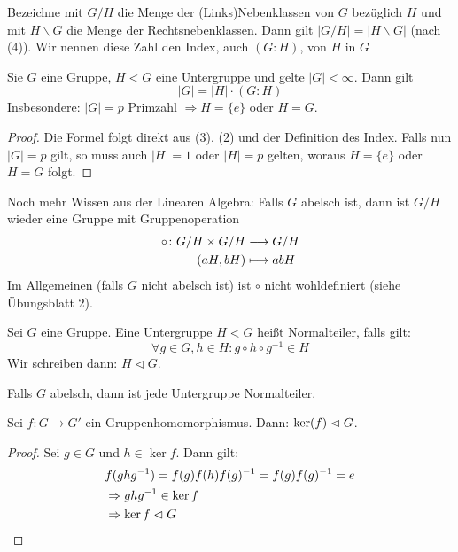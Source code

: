 \documentclass[12pt,a4paper]{scrartcl}
\begin{document}
\begin{defi}
	Bezeichne mit $G/H$ die Menge der (Links)Nebenklassen von $G$ bezüglich $H$ und mit $ H\backslash G$ die Menge der Rechtsnebenklassen. Dann gilt $|G/H| = |H\backslash G|$ (nach (4)). Wir nennen diese Zahl den Index, auch $(G:H)$, von $H$ in $G$
\end{defi}

\begin{satz} \label{thm:lagrange}
	Sie $G$ eine Gruppe, $H<G$ eine Untergruppe und gelte $|G|<\infty$. Dann gilt
	\begin{equation}
		|G| = |H|\cdot (G:H)
	\end{equation}
	Insbesondere: $|G| = p$ Primzahl $\Rightarrow H = \{e\}$ oder $H = G$.
\end{satz}

\begin{proof}
	Die Formel folgt direkt aus (3), (2) und der Definition des Index.
	Falls nun $|G| = p$ gilt, so muss auch $|H| = 1$ oder $|H| = p$ gelten, woraus $H = \{e\}$ oder $H = G$ folgt.
\end{proof}

\noindent Noch mehr Wissen aus der Linearen Algebra: Falls $G$ abelsch ist, dann ist $G/H$ wieder eine Gruppe mit Gruppenoperation
\begin{align*}
	\circ \colon G/H\times G/H &\longrightarrow G/H\\
	(aH,bH)&\longmapsto abH
\end{align*}
Im Allgemeinen (falls $G$ nicht abelsch ist) ist $\circ$ nicht wohldefiniert (siehe Übungsblatt 2).

\begin{defi}
	Sei $G$ eine Gruppe. Eine Untergruppe $H<G$ heißt Normalteiler, falls gilt: 
	\begin{equation*}
	\forall g\in G, h\in H: g\circ h\circ g^{-1}\in H
	\end{equation*}
	Wir schreiben dann: $H\vartriangleleft G$.
\end{defi}
\begin{bem}
	Falls $G$ abelsch, dann ist jede Untergruppe Normalteiler.
\end{bem}

\begin{lem} \label{lem:ker_nt}
	Sei $f\colon G\to G'$ ein Gruppenhomomorphismus.  Dann: $\operatorname{ker}(f)\vartriangleleft G$.
\end{lem}
\begin{proof}
	Sei $g\in G$ und $h\in \ker f$. Dann gilt:
	\begin{align*}
		&f(ghg^{-1}) = f(g)f(h)f(g)^{-1} = f(g)f(g)^{-1} = e \\
		&\Rightarrow ghg^{-1}\in \operatorname{ker} f \\
		&\Rightarrow \operatorname{ker} f\vartriangleleft G
	\end{align*}
\end{proof}
\end{document}
